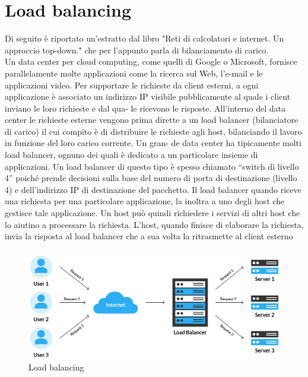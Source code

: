\documentclass[binding=0.6cm]{sapthesis}
\theoremstyle{definition}
\begin{document}
\section{Load balancing}
\label{chapter:load balancing}
Di seguito è riportato un'estratto dal libro "Reti di calcolatori e internet. Un approccio top-down."
\cite{Reti di calcolatori} che per l’appunto parla di bilanciamento di carico.\\
Un data center per cloud computing, come quelli di Google o Microsoft, fornisce parallelamente
molte applicazioni come la ricerca sul Web, l’e-mail e le applicazioni
video. Per supportare le richieste da client esterni, a ogni applicazione è associato un
indirizzo IP visibile pubblicamente al quale i client inviano le loro richieste e dal qua-
le ricevono le risposte. All’interno del data center le richieste esterne vengono prima
dirette a un load balancer (bilanciatore di carico) il cui compito è di distribuire le
richieste agli host, bilanciando il lavoro in funzione del loro carico corrente. Un gran-
de data center ha tipicamente molti load balancer, ognuno dei quali è dedicato a un
particolare insieme di applicazioni. Un load balancer di questo tipo è spesso chiamato
“switch di livello 4” poiché prende decisioni sulla base del numero di porta di destinazione
(livello 4) e dell’indirizzo IP di destinazione del pacchetto. Il load balancer
quando riceve una richiesta per una particolare applicazione, la inoltra a uno degli
host che gestisce tale applicazione. Un host può quindi richiedere i servizi di altri
host che lo aiutino a processare la richiesta. L’host, quando finisce di elaborare la richiesta,
invia la risposta al load balancer che a sua volta la ritrasmette al client esterno

\begin{figure}[h]
    \includegraphics[width=\textwidth]{load-balancing.jpg}
    \caption{Load balancing}
    \label{fig:load-balancer}
\end{figure}
\end{document}
